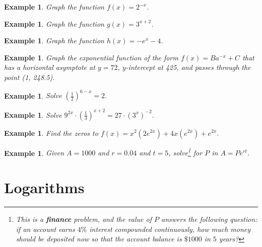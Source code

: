 \documentclass[twoside]{tufte-handout}
\newcommand{\booksection}{0}
\newcommand{\pageheader}{}
\newcounter{ekcounter}%
\theoremstyle{ekimcustom}
\newtheorem{exm}[ekcounter]{Example}
\begin{document}
\begin{exm}{Graph the function $f(x)=2^{-x}$.}
\end{exm}\vskip10pt

\everymath{\displaystyle}
\begin{exm}{Graph the function $g(x)=3^{x+2}$. }
\end{exm}\vskip10pt

\begin{exm}{Graph the function $h(x)=-e^{x}-4$.}
\end{exm}\vskip10pt

\everymath{\displaystyle}
\begin{exm}{Graph the exponential function of the form $f(x)=Ba^{-x}+C$ that has a horizontal asymptote at $y=72$, $y$-intercept at 425, and passes through the point (1, 248.5).}
\end{exm}\vskip10pt

\begin{exm}{Solve $\left(\frac{1}{2}\right)^{6-x}=2$.}
\end{exm}\vskip10pt

\everymath{\displaystyle}
\begin{exm}{Solve $9^{2x}\cdot\left(\frac{1}{3}\right)^{x+2}=27\cdot(3^x)^{-2}$.}
\end{exm}\vskip10pt

\begin{exm}{Find the zeros to $f(x)=x^2(2e^{2x})+4x(e^{2x})+e^{2x}.$}
\end{exm}\vskip10pt




\begin{exm}
Given $A = 1000$ and $r=0.04$ and $t=5$, solve\footnote{This is a {\bf finance} problem, and the value of $P$ answers the following question: if an account earns $4\%$ interest compounded continuously, how much money should be deposited now so that the account balance is $\$1000$ in $5$ years?} for $P$ in $A=Pe^{rt}$. 
\end{exm}



\renewcommand{\booksection}{Logarithms}
\renewcommand{\pageheader}{\booksection }
\section*{\LARGE \pageheader}
%
\end{document}
